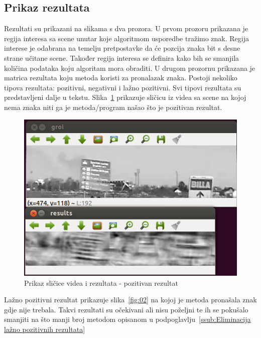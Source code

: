 \newpage
\subsection{Prikaz rezultata} %
\label{sub:Prikaz rezultata}

Rezultati su prikazani na slikama s dva prozora. U prvom prozoru
prikazana je regija interesa sa scene unutar koje algoritmom usporedbe
tražimo znak. Regija interese je odabrana na temelju pretpostavke da će
pozcija znaka bit s desne strane učitane scene. Također regija interesa
se definira kako bih se smanjila količina podataka koju algoritam mora
obraditi. U drugom prozornu prikazana je matrica rezultata koju metoda
koristi za pronalazak znaka.  Postoji nekoliko tipova rezultata:
pozitivni, negativni i lažno pozitivni. Svi tipovi rezultata su
predstavljeni dalje u tekstu. Slika~\ref{fig:01} prikazuje sličicu iz
videa sa scene na kojoj nema znaka niti ga je metoda/program našao što
je pozitivan rezultat.

\begin{figure}[h]
\centering
\includegraphics[scale=0.5]{figures/01.png}
\caption{Prikaz sličice videa i rezultata - pozitivan rezultat}
\label{fig:01}
\end{figure}

Lažno pozitivni rezultat prikazuje slika~\ref{fig:02} na kojoj je metoda
pronašala znak gdje nije trebala. Takvi rezultati su očekivani ali nisu
poželjni te ih se pokušalo smanjiti na što manji broj metodom opisanom 
u podpoglavlju~\ref{ssub:Eliminacija lažno pozitivnih rezultata}

